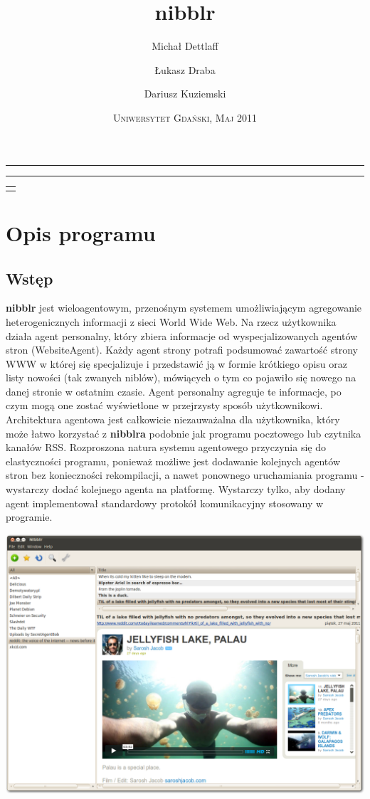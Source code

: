 \documentclass[a4paper,11pt]{report}
\title{nibblr}
\author{Michał Dettlaff \and Łukasz Draba \and Dariusz Kuziemski}
\date{\textsc{Uniwersytet Gdański, Maj 2011}}
\makeatletter
\newcommand{\linia}{\rule{\linewidth}{0.5mm}}
\renewcommand{\maketitle}{\begin{titlepage}
    \vspace*{5cm}
    \noindent\linia
    \begin{center} 
      \LARGE\textsc{\@title}
     \end{center}
     \linia
    \vspace{2cm}
    \begin{flushright}
    \begin{minipage}{5cm}
    \begin{tabular}[t]{l}%
    \@author
    \end{tabular}\par
    \end{minipage}
     \end{flushright}
    \vfill
    \begin{center}
    \@date
    \end{center}
  \end{titlepage}
}
\makeatother
\begin{document}
\maketitle

\section{Opis programu}


\subsection{Wstęp}
\textbf{nibblr} jest wieloagentowym, przenośnym systemem umożliwiającym agregowanie heterogenicznych
informacji z sieci World Wide Web. Na rzecz użytkownika działa agent personalny, który zbiera
informacje od wyspecjalizowanych agentów stron (WebsiteAgent). Każdy agent strony potrafi
podsumować zawartość strony WWW w której się specjalizuje i przedstawić ją w formie krótkiego
opisu oraz listy nowości (tak zwanych niblów), mówiących o tym co pojawiło się nowego na danej
stronie w ostatnim czasie. Agent personalny agreguje te informacje, po czym mogą one zostać
wyświetlone w przejrzysty sposób użytkownikowi. Architektura agentowa jest całkowicie niezauważalna
dla użytkownika, który może łatwo korzystać z \textbf{nibblra} podobnie jak programu pocztowego lub
czytnika kanałów RSS.
\newline
\newline
Rozproszona natura systemu agentowego przyczynia się do elastyczności programu, ponieważ możliwe
jest dodawanie kolejnych agentów stron bez konieczności rekompilacji, a nawet ponownego uruchamiania
programu - wystarczy dodać kolejnego agenta na platformę. Wystarczy tylko, aby dodany agent
implementował standardowy protokół komunikacyjny stosowany w programie.

\begin{center}
	\includegraphics[scale=0.27]{./img/nibblr0.png}
\end{center}
\end{document}
